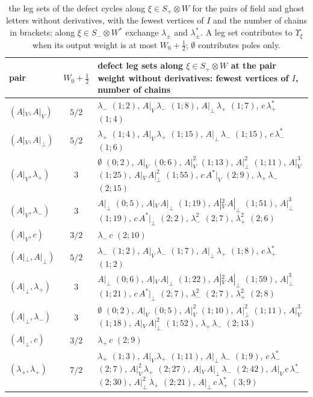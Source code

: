 \documentclass[11pt]{article}
\numberwithin{equation}{section}
\theoremstyle{plain}
\theoremstyle{definition}
\begin{document}
\begin{longtable}{l|c|p{12.2cm}}
\caption{the leg sets of the defect cycles along $\xi\in S_+\otimes W$ for the pairs of field and ghost letters without derivatives, with the fewest vertices of $I$ and the number of chains in brackets; along $\xi\in S_-\otimes W^*$ exchange $\lambda_\pm$ and $\lambda^*_\pm$. A leg set contributes to $\Upsilon_\xi$ when its output weight is at most $W_0+\tfrac12$; $\emptyset$ contributes poles only.}\label{tab:qs-fieldpairs}\\
pair & $W_0+\tfrac12$ & defect leg sets along $\xi\in S_+\otimes W$ at the pair weight without derivatives: fewest vertices of $I$, number of chains\\
\hline
$(A|_V,A|_V)$ & $5/2$ & $\lambda_-$ $(1;2)$, $A|_V\,\lambda_-$ $(1;8)$, $A|_\perp\,\lambda_+$ $(1;7)$, $c\,\lambda^*_+$ $(1;4)$\\
$(A|_V,A|_\perp)$ & $5/2$ & $\lambda_+$ $(1;4)$, $A|_V\,\lambda_+$ $(1;15)$, $A|_\perp\,\lambda_-$ $(1;15)$, $c\,\lambda^*_-$ $(1;6)$\\
$(A|_V,\lambda_+)$ & $3$ & $\emptyset$ $(0;2)$, $A|_V$ $(0;6)$, $A|_V^{2}$ $(1;13)$, $A|_\perp^{2}$ $(1;11)$, $A|_V^{3}$ $(1;25)$, $A|_V\,A|_\perp^{2}$ $(1;55)$, $c\,A^*|_V$ $(2;9)$, $\lambda_+\,\lambda_-$ $(2;15)$\\
$(A|_V,\lambda_-)$ & $3$ & $A|_\perp$ $(0;5)$, $A|_V\,A|_\perp$ $(1;19)$, $A|_V^{2}\,A|_\perp$ $(1;51)$, $A|_\perp^{3}$ $(1;19)$, $c\,A^*|_\perp$ $(2;2)$, $\lambda_-^{2}$ $(2;7)$, $\lambda_+^{2}$ $(2;6)$\\
$(A|_V,c)$ & $3/2$ & $\lambda_-\,c$ $(2;10)$\\
$(A|_\perp,A|_\perp)$ & $5/2$ & $\lambda_-$ $(1;2)$, $A|_V\,\lambda_-$ $(1;7)$, $A|_\perp\,\lambda_+$ $(1;8)$, $c\,\lambda^*_+$ $(1;2)$\\
$(A|_\perp,\lambda_+)$ & $3$ & $A|_\perp$ $(0;6)$, $A|_V\,A|_\perp$ $(1;22)$, $A|_V^{2}\,A|_\perp$ $(1;59)$, $A|_\perp^{3}$ $(1;21)$, $c\,A^*|_\perp$ $(2;7)$, $\lambda_-^{2}$ $(2;7)$, $\lambda_+^{2}$ $(2;8)$\\
$(A|_\perp,\lambda_-)$ & $3$ & $\emptyset$ $(0;2)$, $A|_V$ $(0;5)$, $A|_V^{2}$ $(1;10)$, $A|_\perp^{2}$ $(1;11)$, $A|_V^{3}$ $(1;18)$, $A|_V\,A|_\perp^{2}$ $(1;52)$, $\lambda_+\,\lambda_-$ $(2;13)$\\
$(A|_\perp,c)$ & $3/2$ & $\lambda_+\,c$ $(2;9)$\\
$(\lambda_+,\lambda_+)$ & $7/2$ & $\lambda_+$ $(1;3)$, $A|_V\,\lambda_+$ $(1;11)$, $A|_\perp\,\lambda_-$ $(1;9)$, $c\,\lambda^*_-$ $(2;7)$, $A|_V^{2}\,\lambda_+$ $(2;27)$, $A|_V\,A|_\perp\,\lambda_-$ $(2;42)$, $A|_V\,c\,\lambda^*_-$ $(2;30)$, $A|_\perp^{2}\,\lambda_+$ $(2;21)$, $A|_\perp\,c\,\lambda^*_+$ $(3;9)$\\

\end{longtable}
\end{document}
